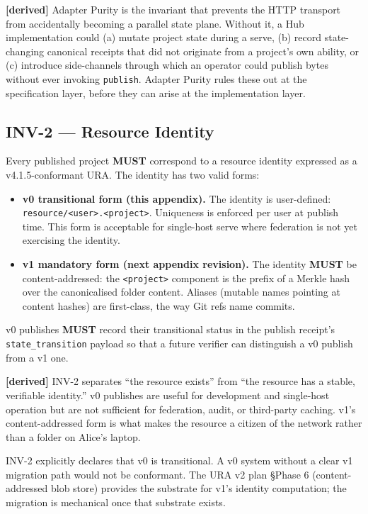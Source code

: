 \documentclass[11pt,a4paper]{article}
\newcommand{\derived}{\textcolor{derivedcolor}{\textbf{[derived]}}\xspace}
\theoremstyle{definition}
\begin{document}
\derived{} Adapter Purity is the invariant that prevents the
HTTP transport from accidentally becoming a parallel state
plane. Without it, a Hub implementation could (a) mutate
project state during a serve, (b) record state-changing
canonical receipts that did not originate from a project's own
ability, or (c) introduce side-channels through which an
operator could publish bytes without ever invoking
\texttt{publish}. Adapter Purity rules these out at the
specification layer, before they can arise at the
implementation layer.

\subsection{INV-2 --- Resource Identity}

\begin{invariant}
Every published project \textbf{MUST} correspond to a resource
identity expressed as a v4.1.5-conformant URA. The identity has
two valid forms:
\begin{itemize}[leftmargin=2em,itemsep=0.1em]
    \item \textbf{v0 transitional form (this appendix).} The
    identity is user-defined: \texttt{resource/<user>.<project>}.
    Uniqueness is enforced per user at publish time. This form
    is acceptable for single-host serve where federation is not
    yet exercising the identity.
    \item \textbf{v1 mandatory form (next appendix revision).}
    The identity \textbf{MUST} be content-addressed: the
    \texttt{<project>} component is the prefix of a Merkle hash
    over the canonicalised folder content. Aliases (mutable
    names pointing at content hashes) are first-class, the way
    Git refs name commits.
\end{itemize}
v0 publishes \textbf{MUST} record their transitional status in
the publish receipt's \texttt{state\_transition} payload so that
a future verifier can distinguish a v0 publish from a v1 one.
\end{invariant}

\derived{} INV-2 separates ``the resource exists'' from ``the
resource has a stable, verifiable identity.'' v0 publishes are
useful for development and single-host operation but are not
sufficient for federation, audit, or third-party caching. v1's
content-addressed form is what makes the resource a citizen of
the network rather than a folder on Alice's laptop.

\begin{warningbox}
INV-2 explicitly declares that v0 is transitional. A v0 system
without a clear v1 migration path would not be conformant. The
URA v2 plan §Phase 6 (content-addressed blob store) provides
the substrate for v1's identity computation; the migration is
mechanical once that substrate exists.
\end{warningbox}
\end{document}
